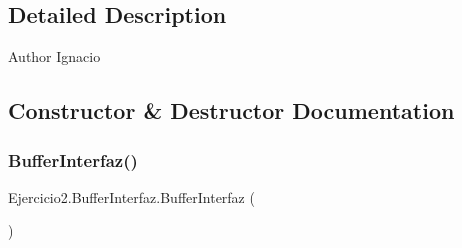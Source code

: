 \subsection{Detailed Description}
\begin{DoxyAuthor}{Author}
Ignacio 
\end{DoxyAuthor}


\subsection{Constructor \& Destructor Documentation}
\mbox{\label{class_ejercicio2_1_1_buffer_interfaz_a659117fee6f4a16a187bf9a637bbbad4}} 
\subsubsection{\texorpdfstring{Buffer\+Interfaz()}{BufferInterfaz()}}
{\footnotesize\ttfamily Ejercicio2.\+Buffer\+Interfaz.\+Buffer\+Interfaz (\begin{DoxyParamCaption}{ }\end{DoxyParamCaption})\hspace{0.3cm}{\ttfamily [inline]}}

